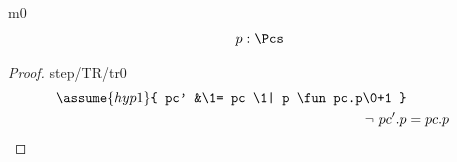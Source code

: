 \documentclass[12pt]{amsart}
\begin{document}
\begin{machine}{m0}
\begin{align*}
\indices{step}{	p: \Pcs}
\end{align*}


\begin{proof}{step/TR/tr0}
\begin{align}
	\assume{hyp1}{ pc' &\1= pc \1| p \fun pc.p\0+1 } \\
	\goal{\neg ~ pc'.p  &= pc.p}
\end{align}
	\easy
\end{proof}

\end{machine}
\end{document}
